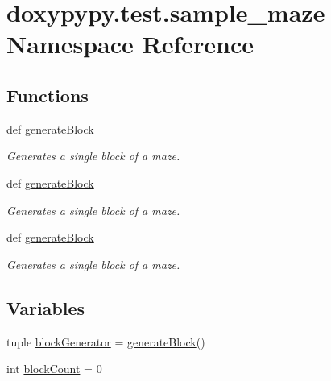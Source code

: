 \hypertarget{namespacedoxypypy_1_1test_1_1sample__maze}{\section{doxypypy.\-test.\-sample\-\_\-maze Namespace Reference}
\label{namespacedoxypypy_1_1test_1_1sample__maze}
}
\subsection*{Functions}
\begin{DoxyCompactItemize}
\item 
def \hyperlink{namespacedoxypypy_1_1test_1_1sample__maze_a8f299aa04feedc2c97d216eae9309167}{generate\-Block}
\begin{DoxyCompactList}\small\item\em Generates a single block of a maze. \end{DoxyCompactList}\item 
def \hyperlink{namespacedoxypypy_1_1test_1_1sample__maze_a8f299aa04feedc2c97d216eae9309167}{generate\-Block}
\begin{DoxyCompactList}\small\item\em Generates a single block of a maze. \end{DoxyCompactList}\item 
def \hyperlink{namespacedoxypypy_1_1test_1_1sample__maze_a32e49e30743a6388aa1e37ed8d0f753d}{generate\-Block}
\begin{DoxyCompactList}\small\item\em Generates a single block of a maze. \end{DoxyCompactList}\end{DoxyCompactItemize}
\subsection*{Variables}
\begin{DoxyCompactItemize}
\item 
tuple \hyperlink{namespacedoxypypy_1_1test_1_1sample__maze_a3bd5285ec2651e7c4ae17ca0ce63fbe3}{block\-Generator} = \hyperlink{namespacedoxypypy_1_1test_1_1sample__maze_a8f299aa04feedc2c97d216eae9309167}{generate\-Block}()
\item 
int \hyperlink{namespacedoxypypy_1_1test_1_1sample__maze_af5cec1785b747e7565e93e5430026d2d}{block\-Count} = 0
\end{DoxyCompactItemize}


